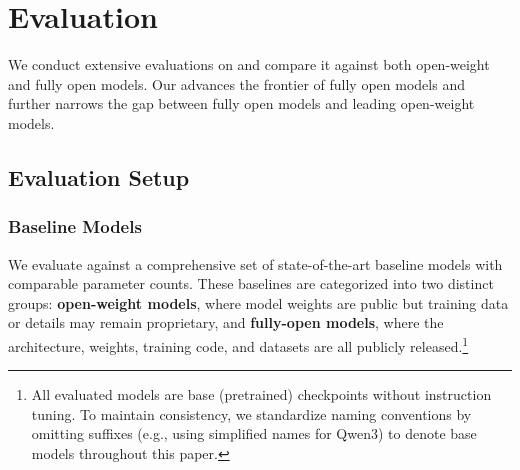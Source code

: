 \section{Evaluation}\label{sec:eval}

We conduct extensive evaluations on \sys and compare it against both open-weight and fully open models. Our \sys advances the frontier of fully open models and further narrows the gap between fully open models and leading open-weight models.

\subsection{Evaluation Setup}

\subsubsection{Baseline Models}
We evaluate \sys against a comprehensive set of state-of-the-art baseline models with comparable parameter counts. These baselines are categorized into two distinct groups: \textbf{open-weight models}, where model weights are public but training data or details may remain proprietary, and \textbf{fully-open models}, where the architecture, weights, training code, and datasets are all publicly released.\footnote{All evaluated models are base (pretrained) checkpoints without instruction tuning. To maintain consistency, we standardize naming conventions by omitting suffixes (e.g., using simplified names for Qwen3) to denote base models throughout this paper.}


